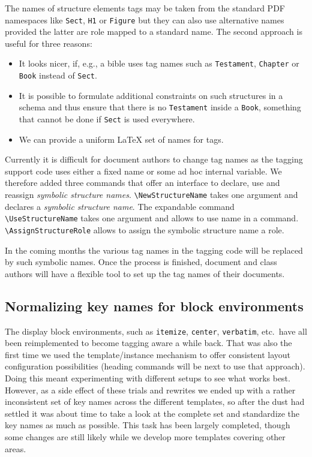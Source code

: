 \documentclass{ltnews}
\begin{document}
 The names of structure elements tags may be taken from the standard
 PDF namespaces like \verb|Sect|, \verb|H1| or \verb|Figure| but they
 can also use alternative names provided the latter are role mapped to
 a standard name. The second approach is useful for three reasons:
  \begin{itemize}
  \item It looks nicer, if, e.g., a bible uses tag names such as
    \texttt{Testament}, \texttt{Chapter} or \texttt{Book} instead of
    \texttt{Sect}.
  \item It is possible to formulate additional constraints on such
    structures in a schema and thus ensure that there is no
    \texttt{Testament} inside a \texttt{Book}, something that cannot
    be done if \texttt{Sect} is used everywhere.
  \item We can provide a uniform LaTeX set of names for tags.
  \end{itemize}
  
  Currently it is difficult for document authors to change tag names
  as the tagging support code uses either a fixed name or some ad hoc
  internal variable. We therefore added three commands that offer an
  interface to declare, use and reassign \emph{symbolic structure
  names}. \verb+\NewStructureName+ takes one argument and declares a
  \emph{symbolic structure name}. The expandable command
  \verb+\UseStructureName+ takes one argument and allows to use name
  in a  command. \verb+\AssignStructureRole+ allows
  to assign the symbolic structure name a role.

  In the coming months the various tag names in the tagging code will
  be replaced by such symbolic names. Once the process is finished,
  document and class authors will have a flexible tool to set up the
  tag names of their documents.


\subsection{Normalizing key names for block environments}

The display block environments, such as \texttt{itemize},
\texttt{center}, \texttt{verbatim}, etc.\ have all been reimplemented
to become tagging aware a while back. That was also the first time we
used the template/instance mechanism to offer consistent layout
configuration possibilities (heading commands will be next to use that
approach). Doing this meant experimenting with different setups to see
what works best. However, as a side effect of these trials and
rewrites we ended up with a rather inconsistent set of key names
across the different templates, so after the dust had settled it was
about time to take a look at the complete set and standardize the key
names as much as possible.  This task has been largely
completed, though some changes are still likely while we
develop more templates covering other areas.
\end{document}
